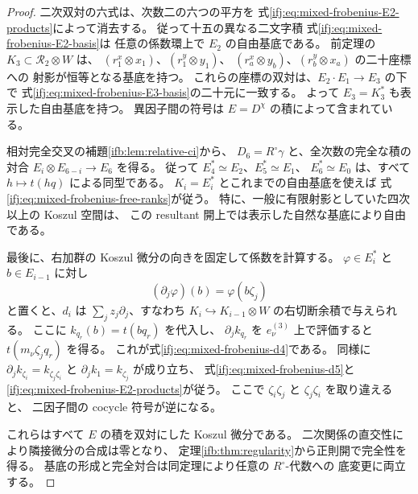 \begin{proof}
二次双対の六式は、次数二の六つの平方を
式\eqref{ifj:eq:mixed-frobenius-E2-products}によって消去する。
従って十五の異なる二文字積
式\eqref{ifj:eq:mixed-frobenius-E2-basis}は
任意の係数環上で $E_2$ の自由基底である。
前定理の $K_3\subset\mathcal R_2\otimes W$ は、
$(r_1^x\otimes x_1)$、$(r_1^y\otimes y_1)$、
$(r_a^x\otimes y_b)$、$(r_b^y\otimes x_a)$ の二十座標への
射影が恒等となる基底を持つ。
これらの座標の双対は、$E_2\cdot E_1\to E_3$ の下で
式\eqref{ifj:eq:mixed-frobenius-E3-basis}の二十元に一致する。
よって $E_3=K_3^*$ も表示した自由基底を持つ。
異因子間の符号は $E=D^\chi$ の積によって含まれている。

相対完全交叉の補題\ref{ifb:lem:relative-ci}から、
$D_6=R^\circ\gamma$ と、全次数の完全な積の対合
$E_i\otimes E_{6-i}\to E_6$ を得る。
従って $E_4^*\simeq E_2$、$E_5^*\simeq E_1$、
$E_6^*\simeq E_0$ は、すべて $h\mapsto t(hq)$ による同型である。
$K_i=E_i^*$ とこれまでの自由基底を使えば
式\eqref{ifj:eq:mixed-frobenius-free-ranks}が従う。
特に、一般に有限射影としていた四次以上の Koszul 空間は、
この resultant 開上では表示した自然な基底により自由である。

最後に、右加群の Koszul 微分の向きを固定して係数を計算する。
$\varphi\in E_i^*$ と $b\in E_{i-1}$ に対し
\[
 (\partial_j\varphi)(b)=\varphi(b\zeta_j)
\]
と置くと、$d_i$ は $\sum_jz_j\partial_j$、すなわち
$K_i\hookrightarrow K_{i-1}\otimes W$ の右切断余積で与えられる。
ここに $k_{q_r}(b)=t(bq_r)$ を代入し、
$\partial_j k_{q_r}$ を $e_\nu^{(3)}$ 上で評価すると
$t(m_\nu\zeta_jq_r)$ を得る。
これが式\eqref{ifj:eq:mixed-frobenius-d4}である。
同様に $\partial_jk_{\zeta_i}=k_{\zeta_j\zeta_i}$ と
$\partial_jk_1=k_{\zeta_j}$ が成り立ち、
式\eqref{ifj:eq:mixed-frobenius-d5}と
\eqref{ifj:eq:mixed-frobenius-E2-products}が従う。
ここで $\zeta_i\zeta_j$ と $\zeta_j\zeta_i$ を取り違えると、
二因子間の cocycle 符号が逆になる。

これらはすべて $E$ の積を双対にした Koszul 微分である。
二次関係の直交性により隣接微分の合成は零となり、
定理\ref{ifb:thm:regularity}から正則開で完全性を得る。
基底の形成と完全対合は同定理により任意の $R^\circ$-代数への
底変更に両立する。
\end{proof}

